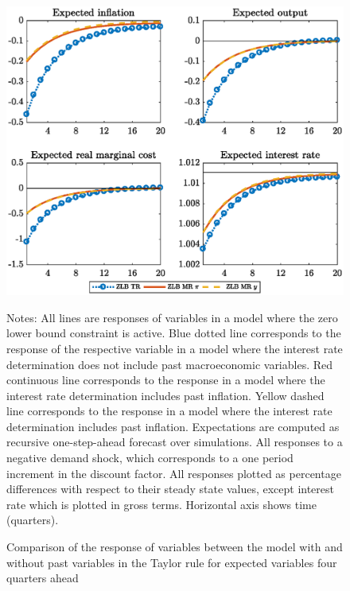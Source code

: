 \documentclass[11pt]{article}
\numberwithin{equation}{section}
\begin{document}
\begin{figure}[H]
	\centering
	\caption{Comparison of the response of variables between the model with and without past variables in the Taylor rule for expected variables four quarters ahead}\label{fig:irfCompExp4_pref}
	\includegraphics[scale=.6]{irfCompExp4_pref}
	\begin{minipage}{\linewidth}
    	\vspace{1mm}
	\footnotesize{{\sc Notes:} All lines are responses of variables in a model where the zero lower bound constraint is active. Blue dotted line corresponds to the response of the respective variable in a model where the interest rate determination does not include past macroeconomic variables. Red continuous line corresponds to the response in a model where the interest rate determination includes past inflation. Yellow dashed line corresponds to the response in a model where the interest rate determination includes past inflation. Expectations are computed as recursive one-step-ahead forecast over simulations. All responses to a negative demand shock, which corresponds to a one period increment in the discount factor. All responses plotted as percentage differences with respect to their steady state values, except interest rate which is plotted in gross terms. Horizontal axis shows time (quarters).}
	\end{minipage}
\end{figure}
\end{document}
